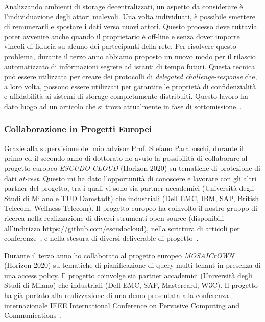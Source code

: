 \documentclass{article}
\begin{document}
\medskip
\noindent Analizzando ambienti di storage decentralizzati, un aspetto da considerare è l'individuazione degli attori malevoli. Una volta individuati, è possibile smettere di remunerarli e spostare i dati verso nuovi attori. Questo processo deve tuttavia poter avvenire anche quando il proprietario è off-line e senza dover imporre vincoli di fiducia su alcuno dei partecipanti della rete. Per risolvere questo problema, durante il terzo anno abbiamo proposto un nuovo modo per il rilascio automatizzato di informazioni segrete ad istanti di tempo futuri. Questa tecnica può essere utilizzata per creare dei protocolli di {\em delegated challenge-response} che, a loro volta, possono essere utilizzati per garantire le proprietà di confidenzialità e affidabilità ai sistemi di storage completamente distribuiti. Questo lavoro ha dato luogo ad un articolo che si trova attualmente in fase di sottomissione~\cite{ityt}.

\subsubsection*{Collaborazione in Progetti Europei}

Grazie alla supervisione del mio advisor Prof. Stefano Paraboschi, durante il primo ed il secondo anno di dottorato ho avuto la possibilità di collaborare al progetto europeo \textit{ESCUDO-CLOUD} (Horizon 2020) su tematiche di protezione di dati \textit{at-rest}. Questo mi ha dato l’opportunità di conoscere e lavorare con gli altri partner del progetto, tra i quali vi sono sia partner accademici (Università degli Studi di Milano e TUD Damstadt) che industriali (Dell EMC, IBM, SAP, British Telecom, Wellness Telecom).
Il progetto europeo ha coinvolto il nostro gruppo di ricerca nella realizzazione di diversi strumenti open-source (disponibili all'indirizzo \url{https://github.com/escudocloud}), nella scrittura di articoli per conferenze~\cite{securecomm,wiscs,cscloud,cns,spc}, e nella stesura di diversi deliverable di progetto~\cite{d23,d25,d26,d34,d35,d43,d44}.

\medskip

\noindent Durante il terzo anno ho collaborato al progetto europeo \textit{MOSAICrOWN} (Horizon 2020) su tematiche di pianificazione di query multi-tenant in presenza di una access policy. Il progetto coinvolge sia partner accademici (Università degli Studi di Milano) che industriali (Dell EMC, SAP, Mastercard, W3C). Il progetto ha già portato alla realizzazione di una demo presentata alla conferenza internazionale IEEE International Conference on Pervasive Computing and Communications~\cite{percom}.
\end{document}
